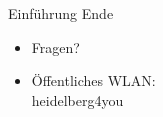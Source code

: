 \begin{frame}
	\begin{center}
		\Huge Einführung Ende
	\end{center}
	\begin{center}
		\begin{itemize}
			\huge\pause\item Fragen?
			      \huge\pause\item Öffentliches WLAN:\\
			      heidelberg4you
		\end{itemize}

	\end{center}
\end{frame}



